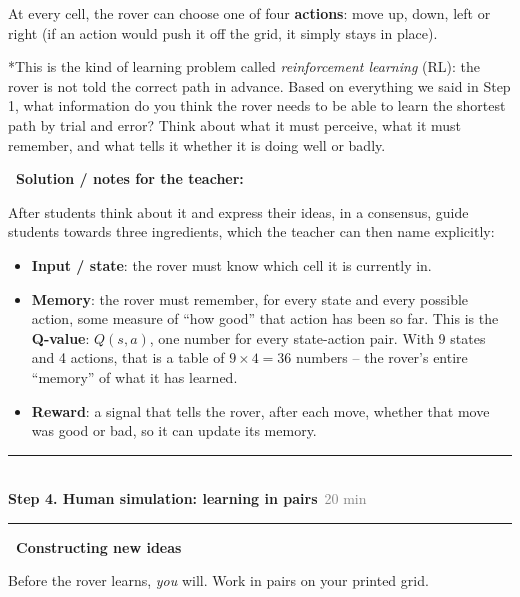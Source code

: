\documentclass[12pt]{article}
\makeatletter
\newcommand{\steplabel}[2]{%
  \vspace{0.7cm}%
  \noindent\textcolor{darkcolor}{\rule{\linewidth}{0.8pt}}\\[2pt]
  {\large\textcolor{darkcolor}{\textbf{#1}}}\hfill\textcolor{gray}{\faClock\ #2}\\[2pt]
  \noindent\textcolor{darkcolor}{\rule{\linewidth}{0.4pt}}
  \vspace{0.2cm}%
}
\newcounter{question}
\newlength\questionheight
\newcommand{\question}{\@ifstar{\question@text}{\question@field}}
\newcommand{\question@heading}[1]{%
  \refstepcounter{question}%
  \vspace{0.3cm}%
  \noindent\textbf{\faEdit\ Question \thequestion: #1}%
}
\newcommand{\question@text}[1]{%
  \question@heading{#1}%
}
\newcommand{\question@field}[2][\questionheight]{%
  \question@heading{#2}%
 \\[0.3em] \begin{Form}
    \TextField[
      name=Q\thequestion,
      multiline=true,
      width=\linewidth,
      height=#1,
      charsize=10pt,
      bordercolor={0 0 0},
      borderwidth=1.8,
      backgroundcolor={1 1 1}
    ]{}
  \end{Form}
  \vspace{0.3cm}%
}
\newenvironment{solution}{%
  \begin{solutionbox}\textbf{\faChalkboardTeacher\ Solution / notes for the teacher:}
}{%
  \end{solutionbox}
}
\makeatother
\begin{document}
At every cell, the rover can choose one of four \textbf{actions}: move up, down, left or right (if an action would push it off the grid, it simply stays in place).

\question*{This is the kind of learning problem called \emph{reinforcement learning} (RL): the rover is not told the correct path in advance. Based on everything we said in Step 1, what information do you think the rover needs to be able to learn the shortest path by trial and error? Think about what it must perceive, what it must remember, and what tells it whether it is doing well or badly.}

\begin{solution}
After students think about it and express their ideas, in a consensus, guide students towards three ingredients, which the teacher can then name explicitly:
\begin{itemize}
  \item \textbf{Input / state}: the rover must know which cell it is currently in.
  \item \textbf{Memory}: the rover must remember, for every state and every possible action, some measure of ``how good'' that action has been so far. This is the \textbf{Q-value}: $Q(s,a)$, one number for every state-action pair. With 9 states and 4 actions, that is a table of $9\times4=36$ numbers -- the rover's entire ``memory'' of what it has learned.
  \item \textbf{Reward}: a signal that tells the rover, after each move, whether that move was good or bad, so it can update its memory.
\end{itemize}
\end{solution}

\vspace{0.4cm}
\steplabel{Step 4. Human simulation: learning in pairs}{20 min}

\textcolor{accentcolor}{\textbf{\faLightbulb\ Constructing new ideas}}

Before the rover learns, \emph{you} will. Work in pairs on your printed grid.
\end{document}
